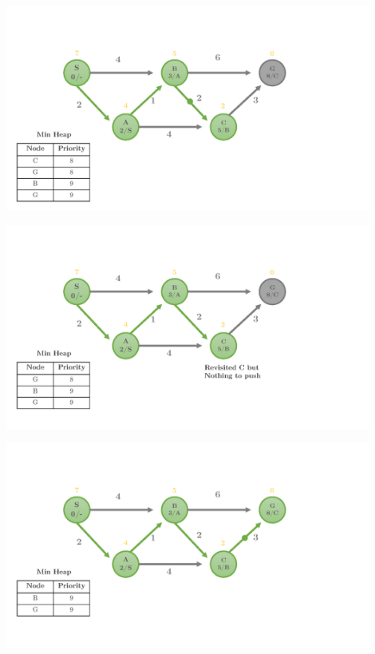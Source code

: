 \documentclass[12pt]{article}
\begin{document}
\begin{center}
  \includegraphics[width=0.9\textwidth]{heuristic2_Page5.png}
\end{center}

\begin{center}
  \includegraphics[width=0.9\textwidth]{heuristic2_Page6.png}
\end{center}

\begin{center}
  \includegraphics[width=0.9\textwidth]{heuristic2_Page7.png}
\end{center}
\end{document}
